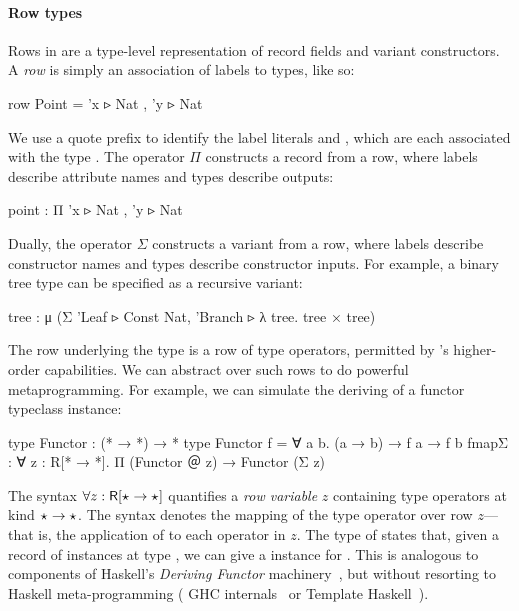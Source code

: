 \documentclass[sigplan,screen]{acmart}
\begin{document}
\paragraph{Row types} Rows in \Rome{} are a type-level representation of record fields and variant constructors.  A \emph{row} is simply an association of labels to types, like so:
\begin{rosi} 
row Point = {'x ▹ Nat , 'y ▹ Nat}
\end{rosi} 

We use a quote prefix to identify the label literals  and , which are each associated with the type . The operator $\Pi$ constructs a record from a row, where labels describe attribute names and types describe outputs:

\begin{rosi} 
point : Π {'x ▹ Nat , 'y ▹ Nat}
\end{rosi}


Dually, the operator $\Sigma$ constructs a variant from a row, where labels describe constructor names and types describe constructor inputs. For example,  a binary tree type can be specified as a recursive variant: 

\begin{rosi}
tree : μ (Σ {'Leaf   ▹ Const Nat, 
             'Branch ▹ λ tree. tree × tree})
\end{rosi}

\Ni The row underlying the  type is a row of type operators, permitted by \Rome's higher-order capabilities. We can abstract over such rows to do powerful metaprogramming. For example, we can simulate the deriving of a functor typeclass instance: 

\begin{rosi}
type Functor : (* → *) → *
type Functor f = ∀ a b. (a → b) → f a → f b
fmapΣ : ∀ z : R[* → *]. Π (Functor ＠ z) → Functor (Σ z)
\end{rosi}

The syntax $\forall z : \mathsf{R}[{\star_{} \to \star_{}}]$ quantifies a \emph{row variable} $z$ containing type operators at kind $\star_{} \to \star_{}$. The syntax   denotes the mapping of the  type operator over row $z$---that is, the application of  to each operator in $z$. The type of  states that, given a record of  instances at type  , we can give a  instance for . This is analogous to components of Haskell's \emph{Deriving Functor} machinery~\citep{Laarhoven07}, but without resorting to Haskell meta-programming (\ala{} GHC internals~\citep{GhcAPI} or Template Haskell~\cite{SheardJ02}).
\end{document}
